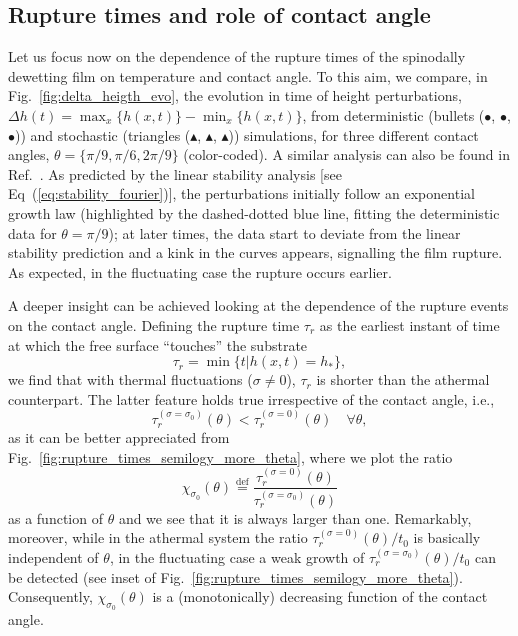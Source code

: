 \subsection{Rupture times and role of contact angle}\label{subsec:results_contact_angle}
Let us focus now on the dependence of the rupture times of the spinodally dewetting film on temperature and contact angle. 
To this aim, we compare, in Fig.~\ref{fig:delta_heigth_evo}, the evolution in time of height perturbations, $\Delta h(t) = \max_x\{h(x,t)\} - \min_x\{h(x,t)\}$, from deterministic (bullets (\textcolor{pyblue}{$\bullet$}, \textcolor{pyorange}{$\bullet$}, \textcolor{pygreen}{$\bullet$})) and stochastic (triangles (\textcolor{pyblue}{$\blacktriangle$}, \textcolor{pyorange}{$\blacktriangle$}, \textcolor{pygreen}{$\blacktriangle$})) simulations, for three different contact angles, $\theta = \{ \pi/9, \pi/6, 2\pi/9 \}$ (color-coded).
A similar analysis can also be found in Ref.~\cite{pahlavanThinFilmsPartial2018}.
As predicted by the linear stability analysis [see Eq~(\ref{eq:stability_fourier})], the perturbations initially follow an exponential growth law (highlighted by the dashed-dotted blue line, fitting the deterministic data for $\theta=\pi/9$); at later times, the data start to deviate from the linear stability prediction and a kink in the curves appears, signalling the film rupture. 
As expected, in the fluctuating case the rupture occurs earlier.

A deeper insight can be achieved looking at the dependence of the rupture events on the contact angle. 
Defining the rupture time $\tau_r$ as the earliest instant of time at which the free surface ``touches'' the substrate
$$
  \tau_r = \min\{t|h(x,t) = h_{\ast}\},
$$
we find that with thermal fluctuations ($\sigma \neq 0$), $\tau_r$ is shorter than the athermal counterpart.
The latter feature holds true irrespective of the contact angle, i.e., 
$$
  \tau_r^{(\sigma=\sigma_0)}(\theta) < \tau_r^{(\sigma=0)}(\theta) \quad \forall \theta,
$$
as it can be better appreciated from Fig.~\ref{fig:rupture_times_semilogy_more_theta}, where we plot 
the ratio
\begin{equation}\label{eq:defchi}
  \chi_{\sigma_0}(\theta) \stackrel{\text{def}}{=} \frac{\tau_r^{(\sigma=0)}(\theta)}{\tau_r^{(\sigma=\sigma_0)}(\theta)}
\end{equation}
as a function of $\theta$ and we see that it is always larger than one. 
Remarkably, moreover, while in the athermal system the ratio $\tau_r^{(\sigma=0)}(\theta)/t_0$ is basically independent of $\theta$, in the fluctuating case a weak growth of $\tau_r^{(\sigma=\sigma_0)}(\theta)/t_0$ can be detected (see inset of Fig.~\ref{fig:rupture_times_semilogy_more_theta}). 
Consequently, $\chi_{\sigma_0}(\theta)$ is a (monotonically) decreasing function of the contact angle.

